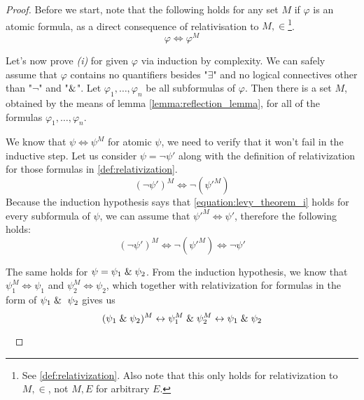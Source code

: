 \begin{proof}
Before we start, note that the following holds for any set $M$ if $\varphi$ is an atomic formula, as a direct consequence of relativisation to $M, \in$\footnote{See \ref{def:relativization}. Also note that this only holds for relativization to $M, \in$, not $M, E$ for arbitrary $E$.}. 
\begin{equation}
\varphi \iff \varphi^M
\end{equation}

Let's now prove \emph{(i)} for given $\varphi$ via induction by complexity. We can safely assume that $\varphi$ contains no quantifiers besides "$\exists$" and no logical connectives other than "$\neg$" and "$\mathrel{\&}$".
Let $\varphi_1, \ldots, \varphi_n$ be all subformulas of $\varphi$. Then there is a set $M$, obtained by the means of lemma \ref{lemma:reflection_lemma}, for all of the formulas $\varphi_1, \ldots, \varphi_n$. 

We know that $\psi \iff \psi^M$ for atomic $\psi$, we need to verify that it won't fail in the inductive step.
Let us consider $\psi = \neg \psi'$ along with the definition of relativization for those formulas in \ref{def:relativization}.
\begin{equation}
(\neg \psi')^M \iff \neg (\psi'^M)
\end{equation}
Because the induction hypothesis says that \ref{equation:levy_theorem_i} holds for every subformula of $\psi$, we can assume that $\psi'^M \iff \psi'$, therefore the following holds:
\begin{equation}
 (\neg \psi')^{M} \iff \neg (\psi'^M) \iff \neg \psi'
\end{equation}

The same holds for $\psi = \psi_1 \mathrel{\&} \psi_2$. From the induction hypothesis, we know that $\psi_1^M \iff \psi_1$ and $\psi_2^M \iff \psi_2$, which together with relativization for formulas in the form of $\psi_1 \et \psi_2$ gives us
\begin{equation}
(\psi_1 \mathrel{\&} \psi_2)^M \leftrightarrow \psi_1^M \mathrel{\&} \psi_2^M \leftrightarrow \psi_1 \mathrel{\&} \psi_2
\end{equation}

\


\end{proof}
